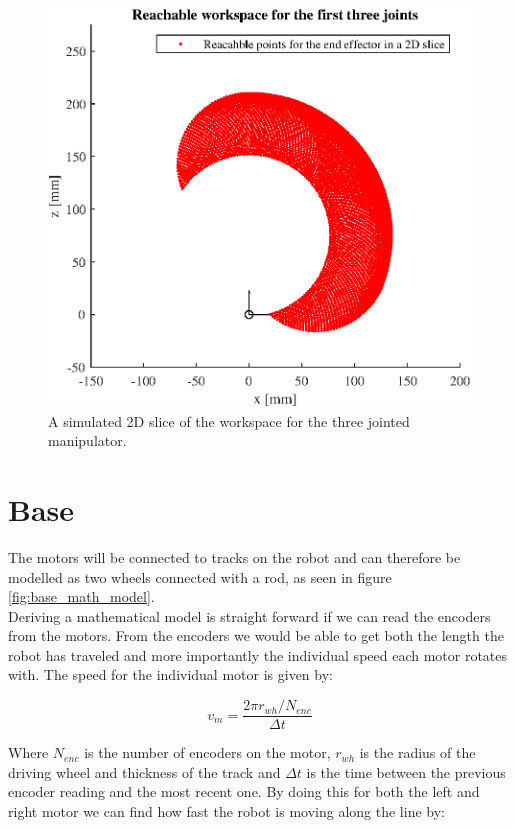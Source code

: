 \begin{figure}[H]
    \centering
    \includegraphics[width=0.7\columnwidth]{chapters/img/workspace.eps}
    \caption{A simulated 2D slice of the workspace for the three jointed manipulator.}
    \label{fig:workspace_simulated}
\end{figure}

















\section*{Base}

The motors will be connected to tracks on the robot and can therefore be modelled as two wheels connected with a rod, as seen in figure \ref{fig:base_math_model}.\\ 
Deriving a mathematical model is straight forward if we can read the encoders from the motors. From the encoders we would be able to get both the length the robot has traveled and more importantly the individual speed each motor rotates with. The speed for the individual motor is given by: 

\begin{equation}
    v_m=\frac{2\pi r_{wh}/N_{enc}}{\Delta t}
    \label{eq:base_system_eq1}
\end{equation}

\noindent Where $N_{enc}$ is the number of encoders on the motor, $r_{wh}$ is the radius of the driving wheel and thickness of the track and $\Delta t$ is the time between the previous encoder reading and the most recent one. By doing this for both the left and right motor we can find how fast the robot is moving along the line by:

